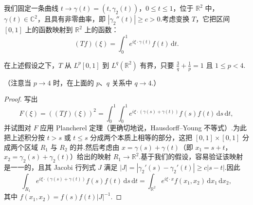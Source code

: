 \documentclass[
  BookTitleCN={傅里叶分析中的振动积分},
  BookTitleEN={Oscillatory Integrals in Fourier Analysis},
  OriginalAuthor={E.~M. Stein},
  OriginalEdition={Proc. Sympos. Pure Math. 35, Part~1},
  OriginalPublisher={American Mathematical Society},
  OriginalYear={1979},
  Translator={翻译及重排},
  ModelUsed={Codex CLI},
  Biblatex=false,
  TranslationDate={2026年8月27日}
]{mathtranslation}
\numberwithin{equation}{chapter}   %
\newcommand{\R}{\mathbb{R}}
\newcommand{\C}{\mathbb{C}}
\begin{document}
我们固定一条曲线 $t\to\gamma(t)=(t,\gamma_{2}(t))$，$0\leq t\leq1$，位于 $\R^{2}$ 中，$\gamma(t)\in\C^{2}$，且具有非零曲率，即 $|\gamma_{2}''(t)|\geq c>0$.考虑变换 $T$，它把区间 $[0,1]$ 上的函数映射到 $\R^{2}$ 上的函数：
\begin{equation}
  (Tf)(\xi)=\int_{0}^{1}e^{i\xi\cdot\gamma(t)}f(t)\,\mathrm{d}t . \label{eq:7.1}
\end{equation}

\begin{theorem}\label{thm:9}
  在上述假设之下，$T$ 从 $L^{p}[0,1]$ 到 $L^{q}(\R^{2})$ 有界，只要 $\frac{3}{q}+\frac{1}{p}=1$ 且 $1\leq p<4$.
\end{theorem}

\noindent（注意当 $p\to4$ 时，在上面的 $p$、$q$ 关系中 $q\to4$.）

\begin{proof}
  写出
  \begin{equation}
    F(\xi)=((Tf)(\xi))^{2}=\int_{0}^{1}\int_{0}^{1}e^{i\xi\cdot(\gamma(s)+\gamma(t))}f(s)f(t)\,\mathrm{d}s\,\mathrm{d}t, \label{eq:7.2}
  \end{equation}
  并试图对 $F$ 应用 Plancherel 定理（更确切地说，Hausdorff--Young 不等式）.为此把上述积分按 $t>s$ 或 $t\leq s$ 分成两个本质上相等的部分，这把 $[0,1]\times[0,1]$ 分成两个区域 $R_{1}$ 与 $R_{2}$ 的并.然后考虑由 $x=\gamma(s)+\gamma(t)$（即 $x_{1}=s+t$，$x_{2}=\gamma_{2}(s)+\gamma_{2}(t)$）给出的映射 $R_{1}\to\R^{2}$.基于我们的假设，容易验证该映射是一一的，且其 Jacobi 行列式 $J$ 满足 $|J|=|\gamma_{2}'(s)-\gamma_{2}'(t)|\geq c|s-t|$.因此
  \begin{equation}
    \int_{R_{1}}e^{i\xi\cdot(\gamma(s)+\gamma(t))}f(s)f(t)\,\mathrm{d}s\,\mathrm{d}t=\int_{\R^{2}}e^{i\xi\cdot x}f(x_{1},x_{2})\,\mathrm{d}x_{1}\,\mathrm{d}x_{2}, \label{eq:7.3}
  \end{equation}
  其中 $f(x_{1},x_{2})=f(s)f(t)|J|^{-1}$.


\end{proof}
\end{document}
